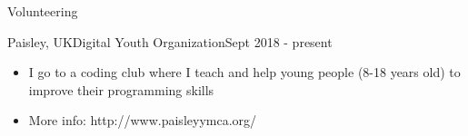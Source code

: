 \documentclass[]{mcdowellcv}
\begin{document}
	\begin{cvsection}{Volunteering}
		\begin{cvsubsection}{Paisley, UK}{Digital Youth Organization}{Sept 2018 - present}
			\begin{itemize}
				\item I go to a coding club where I teach and help young people (8-18 years old) to improve their programming skills
				\item More info: http://www.paisleyymca.org/
			\end{itemize}
		\end{cvsubsection}
	\end{cvsection}
	
\end{document}
